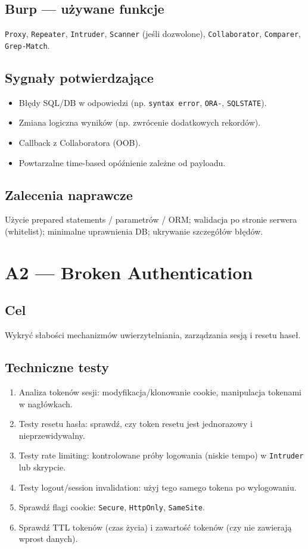 \documentclass[11pt,a4paper]{article}
\begin{document}
	\subsection*{Burp --- używane funkcje}
	\texttt{Proxy}, \texttt{Repeater}, \texttt{Intruder}, \texttt{Scanner} (jeśli dozwolone), \texttt{Collaborator}, \texttt{Comparer}, \texttt{Grep-Match}.
	
	\subsection*{Sygnały potwierdzające}
	\begin{itemize}
		\item Błędy SQL/DB w odpowiedzi (np. \texttt{syntax error}, \texttt{ORA-}, \texttt{SQLSTATE}).
		\item Zmiana logiczna wyników (np. zwrócenie dodatkowych rekordów).
		\item Callback z Collaboratora (OOB).
		\item Powtarzalne time-based opóźnienie zależne od payloadu.
	\end{itemize}
	
	\subsection*{Zalecenia naprawcze}
	Użycie prepared statements / parametrów / ORM; walidacja po stronie serwera (whitelist); minimalne uprawnienia DB; ukrywanie szczegółów błędów.
	
	\newpage
	\section{A2 --- Broken Authentication}
	\subsection*{Cel}
	Wykryć słabości mechanizmów uwierzytelniania, zarządzania sesją i resetu haseł.
	
	\subsection*{Techniczne testy}
	\begin{enumerate}[leftmargin=*,label=\arabic*)]
		\item Analiza tokenów sesji: modyfikacja/klonowanie cookie, manipulacja tokenami w nagłówkach.
		\item Testy resetu hasła: sprawdź, czy token resetu jest jednorazowy i nieprzewidywalny.
		\item Testy rate limiting: kontrolowane próby logowania (niskie tempo) w \texttt{Intruder} lub skrypcie.
		\item Testy logout/session invalidation: użyj tego samego tokena po wylogowaniu.
		\item Sprawdź flagi cookie: \texttt{Secure}, \texttt{HttpOnly}, \texttt{SameSite}.
		\item Sprawdź TTL tokenów (czas życia) i zawartość tokenów (czy nie zawierają wprost danych).
	\end{enumerate}
	
\end{document}
